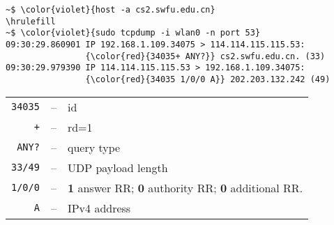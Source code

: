 \documentclass[varwidth=31.5em,crop]{standalone}
\begin{document}
\begin{Verbatim}[commandchars=\\\{\}]
~$ \color{violet}{host -a cs2.swfu.edu.cn}
\hrulefill
~$ \color{violet}{sudo tcpdump -i wlan0 -n port 53}
09:30:29.860901 IP 192.168.1.109.34075 > 114.114.115.115.53:
                {\color{red}{34035+ ANY?}} cs2.swfu.edu.cn. (33)
09:30:29.979390 IP 114.114.115.115.53 > 192.168.1.109.34075:
                {\color{red}{34035 1/0/0 A}} 202.203.132.242 (49)
\end{Verbatim}
\vspace{-1.5em}
\hrulefill
\begin{center}
  \begin{tabular}{rcl}
    \texttt{34035}&--&id\\
    \texttt{+}&--&rd=1\\
    \texttt{ANY?}&--& query type\\
    \texttt{33/49}&--&UDP payload length\\
    \texttt{1/0/0}&--&\textbf{1} answer RR; \textbf{0} authority RR; \textbf{0} additional RR.\\
    \texttt{A}&--&IPv4 address
  \end{tabular}
\end{center}
\end{document}
